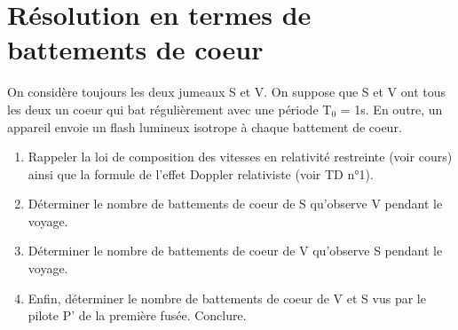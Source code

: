 \section{Résolution en termes de battements de coeur} %
On considère toujours les deux jumeaux S et V. On suppose que S et V ont tous les deux un
coeur qui bat régulièrement avec une période T$_0$ = 1s. En outre, un appareil envoie un flash
lumineux isotrope à chaque battement de coeur.
\begin{enumerate}
  \item Rappeler la loi de composition des vitesses en relativité restreinte (voir cours) ainsi que la
formule de l’effet Doppler relativiste (voir TD n°1).
  \item Déterminer le nombre de battements de coeur de S qu’observe V pendant le voyage.
  \item Déterminer le nombre de battements de coeur de V qu’observe S pendant le voyage.
  \item Enfin, déterminer le nombre de battements de coeur de V et S vus par le pilote P' de la
première fusée. Conclure.
\end{enumerate}
